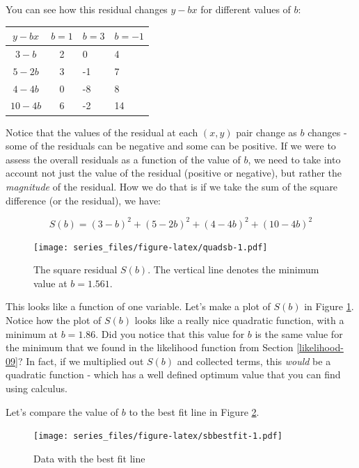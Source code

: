 \documentclass[
]{book}
\theoremstyle{definition}
\theoremstyle{definition}
\theoremstyle{definition}
\theoremstyle{remark}
\begin{document}
You can see how this residual changes \(y-bx\) for different values of \(b\):

\begin{longtable}[]{@{}ccll@{}}
\toprule
\(y-bx\) & \(b=1\) & \(b=3\) & \(b=-1\) \\
\midrule
\endhead
\(3-b\) & 2 & 0 & 4 \\
\(5-2b\) & 3 & -1 & 7 \\
\(4-4b\) & 0 & -8 & 8 \\
\(10-4b\) & 6 & -2 & 14 \\
\bottomrule
\end{longtable}

Notice that the values of the residual at each \((x,y)\) pair change as \(b\) changes - some of the residuals can be negative and some can be positive. If we were to assess the overall residuals as a function of the value of \(b\), we need to take into account not just the value of the residual (positive or negative), but rather the \emph{magnitude} of the residual. How we do that is if we take the sum of the square difference (or the residual), we have:

\begin{equation}
S(b)=(3-b)^2+(5-2b)^2+(4-4b)^2+(10-4b)^2
\end{equation}

\begin{figure}
\centering
\texttt{[image: series\_files/figure-latex/quadsb-1.pdf]}
\caption{\label{fig:quadsb}The square residual \(S(b)\). The vertical line denotes the minimum value at \(b=1.561\).}
\end{figure}

This looks like a function of one variable. Let's make a plot of \(S(b)\) in Figure \ref{fig:quadsb}. Notice how the plot of \(S(b)\) looks like a really nice quadratic function, with a minimum at \(b=1.86\). Did you notice that this value for \(b\) is the same value for the minimum that we found in the likelihood function from Section \ref{likelihood-09}? In fact, if we multiplied out \(S(b)\) and collected terms, this \emph{would} be a quadratic function - which has a well defined optimum value that you can find using calculus.

Let's compare the value of \(b\) to the best fit line in Figure \ref{fig:sbbestfit}.

\begin{figure}
\centering
\texttt{[image: series\_files/figure-latex/sbbestfit-1.pdf]}
\caption{\label{fig:sbbestfit}Data with the best fit line}
\end{figure}
\end{document}
